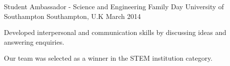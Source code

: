 \begin{cventries}
  \cventry
    {Student Ambassador - Science and Engineering Family Day} %
    {University of Southampton} %
    {Southampton, U.K} %
    {March 2014} %
    {
      \begin{cvitems} %
        \item {Developed interpersonal and communication skills by discussing ideas and answering enquiries.}
        \item {Our team was selected as a winner in the STEM institution category.}
      \end{cvitems}
    }

\end{cventries}

